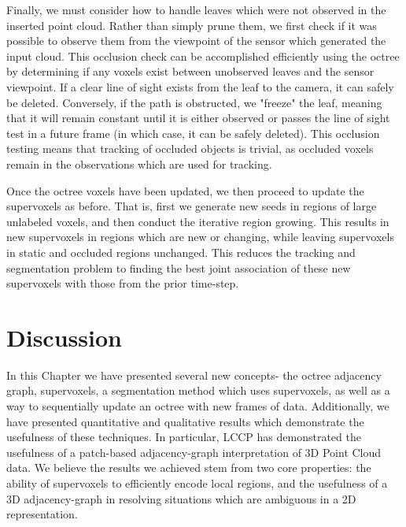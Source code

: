 Finally, we must consider how to handle leaves which were not observed in the inserted point cloud. Rather than simply prune them, we first check if it was possible to observe them from the viewpoint of the sensor which generated the input cloud. This occlusion check can be accomplished efficiently using the octree by determining if any voxels exist between unobserved leaves and the sensor viewpoint. If a clear line of sight exists from the leaf to the camera, it can safely be deleted. Conversely, if the path is obstructed, we "freeze" the leaf, meaning that it will remain constant until it is either observed or passes the line of sight test in a future frame (in which case, it can be safely deleted). This occlusion testing means that tracking of occluded objects is trivial, as occluded voxels remain in the observations which are used for tracking.

Once the octree voxels have been updated, we then proceed to update the supervoxels as before. That is, first we generate new seeds in regions of large unlabeled voxels, and then conduct the iterative region growing. This results in new supervoxels in regions which are new or changing, while leaving supervoxels in static and occluded regions unchanged. This reduces the tracking and segmentation problem to finding the best joint association of these new supervoxels with those from the prior time-step.

\section{Discussion}

In this Chapter we have presented several new concepts- the octree adjacency graph, supervoxels, a segmentation method which uses supervoxels, as well as a way to sequentially update an octree with new frames of data. Additionally, we have presented quantitative and qualitative results which demonstrate the usefulness of these techniques. In particular, LCCP has demonstrated the usefulness of a patch-based adjacency-graph interpretation of 3D Point Cloud data. We believe the results we achieved stem from two core properties: the ability of supervoxels to efficiently encode local regions, and the usefulness of a 3D adjacency-graph in resolving situations which are ambiguous in a 2D representation.

